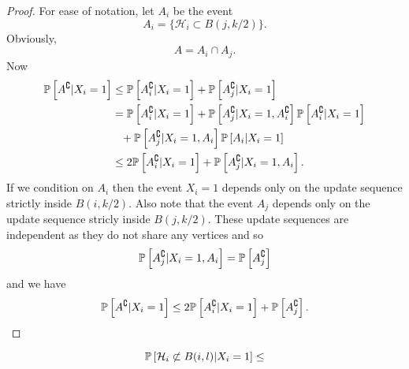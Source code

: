\begin{proof}
	For ease of notation, let $A_i$ be the event
	\begin{equation}
		A_i = \{\mathcal{H}_i \subset B(j, k/2)\}.
	\end{equation}
	Obviously, 
	\begin{equation}
		A = A_i \cap A_j.
	\end{equation}
	Now
	\begin{align}
		\mathbb{P}\left[A^\complement | X_i = 1\right] &\leq \mathbb{P}\left[A_i^\complement | X_i = 1\right] + \mathbb{P}\left[A_j^\complement | X_i = 1\right]\\
		&= \mathbb{P}\left[A_i^\complement | X_i = 1\right] + \mathbb{P}\left[A_j^\complement | X_i = 1, A_i^\complement \right] \mathbb{P}\left[A_i^\complement | X_i = 1\right] \notag \\
		&\phantom{=} + \mathbb{P}\left[A_j^\complement | X_i = 1, A_i \right] \mathbb{P}\left[A_i | X_i = 1\right]\\
		&\leq 2\mathbb{P}\left[A_i^\complement | X_i = 1\right]+ \mathbb{P}\left[A_j^\complement | X_i = 1, A_i \right].\\
	\end{align}
	If we condition on $A_i$ then the event $X_i = 1$ depends only on the update sequence strictly inside $B(i, k/2)$. Also note that the event $A_j$ depends only on the update sequence stricly inside $B(j, k/2)$. These update sequences are independent as they do not share any vertices and so
	\begin{equation}
		\mathbb{P}\left[A_j^\complement | X_i = 1, A_i \right] = \mathbb{P}\left[A_j^\complement \right]
	\end{equation}
	and we have
	\begin{equation}
		\mathbb{P}\left[A^\complement | X_i = 1\right] \leq 2\mathbb{P}\left[A_i^\complement | X_i = 1\right]+ \mathbb{P}\left[A_j^\complement \right].
	\end{equation}
\end{proof}
\begin{lemma}
	\begin{equation}
		\mathbb{P}\left[\mathcal{H}_i \not\subset B(i, l) | X_i = 1\right] \leq
	\end{equation}
\end{lemma}

